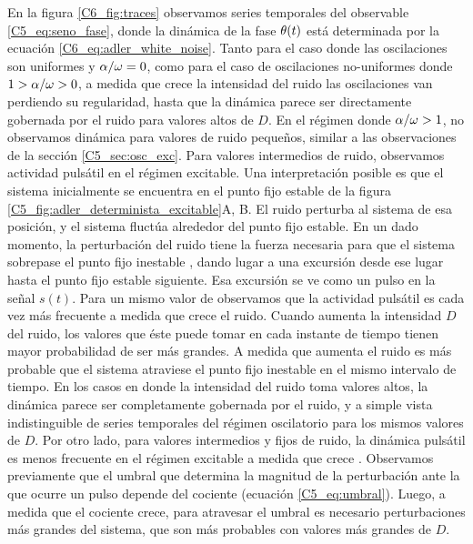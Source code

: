 \documentclass[./main.tex]{subfiles}
\begin{document}
En la figura \ref{C6_fig:traces} observamos series temporales del observable \ref{C5_eq:seno_fase}, donde la dinámica de la fase $\theta(t)$ está determinada por la ecuación \ref{C6_eq:adler_white_noise}. Tanto para el caso donde las oscilaciones son uniformes y $\alpha/\omega = 0$, como para el caso de oscilaciones no-uniformes donde $1 > \alpha/\omega > 0$, a medida que crece la intensidad del ruido las oscilaciones van perdiendo su regularidad, hasta que la dinámica parece ser directamente gobernada por el ruido para valores altos de $D$. En el régimen donde $\alpha/\omega >1$, no observamos dinámica para valores de ruido pequeños, similar a las observaciones de la sección \ref{C5_sec:osc_exc}. Para valores intermedios de ruido, observamos actividad pulsátil en el régimen excitable. Una interpretación posible es que el sistema inicialmente se encuentra en el punto fijo estable \xxe de la figura \ref{C5_fig:adler_determinista_excitable}A, B. El ruido perturba al sistema de esa posición, y el sistema fluctúa alrededor del punto fijo estable. En un dado momento, la perturbación del ruido tiene la fuerza necesaria para que el sistema sobrepase el punto fijo inestable \xxi, dando lugar a una excursión desde ese lugar hasta el punto fijo estable siguiente. Esa excursión se ve como un pulso en la señal $s(t)$. Para un mismo valor de \dddelta observamos que la actividad pulsátil es cada vez más frecuente  a medida que crece el ruido. Cuando aumenta la intensidad $D$ del ruido, los valores que éste puede tomar en cada instante de tiempo tienen mayor probabilidad de ser más grandes. A medida que aumenta el ruido es más probable que el sistema atraviese el punto fijo inestable en el mismo intervalo de tiempo. En los casos en donde la intensidad del ruido toma valores altos, la dinámica parece ser completamente gobernada por el ruido, y a simple vista indistinguible de series temporales del régimen oscilatorio para los mismos valores de $D$. Por otro lado, para valores intermedios y fijos de ruido, la dinámica pulsátil es menos frecuente en el régimen excitable a medida que crece \dddelta. Observamos previamente que el umbral que determina la magnitud de la perturbación ante la que ocurre un pulso depende del cociente \dddelta (ecuación \ref{C5_eq:umbral}). Luego, a medida que el cociente \dddelta crece, para atravesar el umbral es necesario perturbaciones más grandes del sistema, que son más probables con valores más grandes de $D$.
\end{document}
